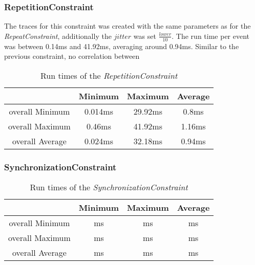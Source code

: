 \subsubsection{RepetitionConstraint}
	The traces for this constraint was created with the same parameters as for the \textit{RepeatConstraint}, additionally the $jitter$ was set $\frac{lower}{10}$. The run time per event was between 0.14ms and 41.92ms, averaging around 0.94ms. Similar to the previous constraint, no correlation between 
	\begin{table}
		\begin{tabular}{|c|c|c|c|}
			\hline
							& Minimum &  Maximum &  Average \\
			\hline
			overall Minimum & 0.014ms & 29.92ms & 0.8ms\\
			\hline
			overall Maximum & 0.46ms & 41.92ms & 1.16ms\\
			\hline
			overall Average & 0.024ms & 32.18ms & 0.94ms\\
			\hline
		\end{tabular}
		\centering
		\caption{Run times of the \textit{RepetitionConstraint}}
		\label{tab:runtimeRepetition}
	\end{table}
	
	
	
	
\subsubsection{SynchronizationConstraint}
\begin{table}
	\begin{tabular}{|c|c|c|c|}
		\hline
		& Minimum &  Maximum &  Average \\
		\hline
		overall Minimum & ms & ms & ms\\
		\hline
		overall Maximum & ms & ms & ms\\
		\hline
		overall Average & ms & ms & ms\\
		\hline
	\end{tabular}
	\centering
	\caption{Run times of the \textit{SynchronizationConstraint}}
	\label{tab:runtimeSynchronization}
\end{table}

